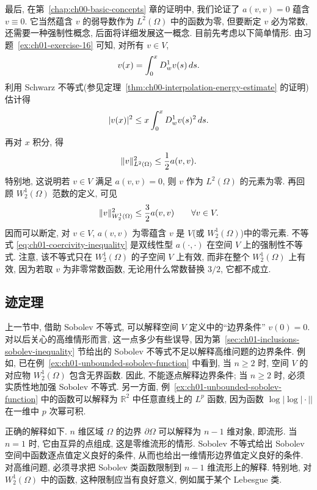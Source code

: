 最后, 在第~\ref{chap:ch00-basic-concepts} 章的证明中, 我们论证了 $a(v,v)=0$ 蕴含 $v\equiv0$. 它当然蕴含 $v$ 的弱导数作为 $L^2(\Omega)$ 中的函数为零, 但要断定 $v$ 必为常数, 还需要一种强制性概念, 后面将详细发展这一概念. 目前先考虑以下简单情形. 由习题~\ref{ex:ch01-exercise-16} 可知, 对所有 $v\in V$,
\[
\MathBookFormulaID{formula-ch01-v-integral-representation}
v(x)=\int_0^xD_w^1v(s)\,ds.
\]
利用 Schwarz 不等式(参见定理~\ref{thm:ch00-interpolation-energy-estimate} 的证明)估计得
\[
\MathBookFormulaID{formula-ch01-v-pointwise-energy-bound}
|v(x)|^2\leq x\int_0^xD_w^1v(s)^2\,ds.
\]
再对 $x$ 积分, 得
\[
\MathBookFormulaID{formula-ch01-v-l2-energy-bound}
\|v\|_{L^2(\Omega)}^2\leq\frac12a(v,v).
\]
特别地, 这说明若 $v\in V$ 满足 $a(v,v)=0$, 则 $v$ 作为 $L^2(\Omega)$ 的元素为零. 再回顾 $W_2^1(\Omega)$ 范数的定义, 可见
\setcounter{equation}{0}
\begin{equation}
\MathBookFormulaID{formula-ch01-coercivity-inequality}
\|v\|_{W_2^1(\Omega)}^2\leq\frac32a(v,v)
\qquad\forall v\in V.
\label{eq:ch01-coercivity-inequality}
\end{equation}
因而可以断定, 对 $v\in V$, $a(v,v)$ 为零蕴含 $v$ 是 $V$(或 $W_2^1(\Omega)$)中的零元素. 不等式 \eqref{eq:ch01-coercivity-inequality} 是双线性型 $a(\cdot,\cdot)$ 在空间 $V$ 上的强制性不等式. 注意, 该不等式只在 $W_2^1(\Omega)$ 的子空间 $V$ 上有效, 而非在整个 $W_2^1(\Omega)$ 上有效, 因为若取 $v$ 为非零常数函数, 无论用什么常数替换 $3/2$, 它都不成立.

\subsection{迹定理}
\label{sec:ch01-trace-theorems}

上一节中, 借助 Sobolev 不等式, 可以解释空间 $V$ 定义中的``边界条件'' $v(0)=0$. 对以后关心的高维情形而言, 这一点多少有些误导, 因为第~\ref{sec:ch01-inclusions-sobolev-inequality} 节给出的 Sobolev 不等式不足以解释高维问题的边界条件. 例如, 已在例~\ref{ex:ch01-unbounded-sobolev-function} 中看到, 当 $n\geq2$ 时, 空间 $V$ 的对应物 $W_2^1(\Omega)$ 包含无界函数. 因此, 不能逐点解释边界条件; 当 $n\geq2$ 时, 必须实质性地加强 Sobolev 不等式. 另一方面, 例~\ref{ex:ch01-unbounded-sobolev-function} 中的函数可以解释为 $\mathbb R^2$ 中任意直线上的 $L^p$ 函数, 因为函数 $\log|\log|\cdot||$ 在一维中 $p$ 次幂可积.

正确的解释如下. $n$ 维区域 $\Omega$ 的边界 $\partial\Omega$ 可以解释为 $n-1$ 维对象, 即流形. 当 $n=1$ 时, 它由互异的点组成, 这是零维流形的情形. Sobolev 不等式给出 Sobolev 空间中函数逐点值定义良好的条件, 从而也给出一维情形边界值定义良好的条件. 对高维问题, 必须寻求把 Sobolev 类函数限制到 $n-1$ 维流形上的解释. 特别地, 对 $W_2^1(\Omega)$ 中的函数, 这种限制应当有良好意义, 例如属于某个 Lebesgue 类.


